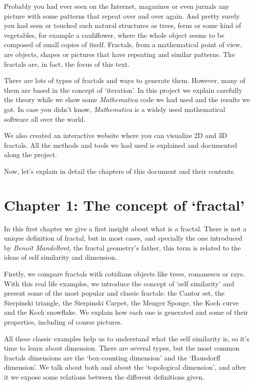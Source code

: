 
Probably you had ever seen on the Internet, magazines or even jurnals any picture with some patterns that repeat over and over again. And pretty surely you had seen or touched such natural structures as trees, ferns or some kind of vegetables, for example a cauliflower, where the whole object seems to be composed of small copies of itself. Fractals, from a mathematical point of view, are objects, shapes or pictures that have repeating and similar patterns. The fractals are, in fact, the focus of this text.

There are lots of types of fractals and ways to generate them. However, many of them are based in the concept of `iteration'. In this project we explain carefully the theory while we show some \textit{Mathematica} code we had used and the results we got. In case you didn't know, \textit{Mathematica} is a widely used mathematical software all over the world. 

We also created an interactive website where you can visualize 2D and 3D fractals. All the methods and tools we had used is explained and documented along the project.

Now, let's explain in detail the chapters of this document and their contents.

\section*{Chapter 1: The concept of `fractal'}

In this first chapter we give a first insight about what is a fractal. There is not a unique definition of fractal, but in most cases, and specially the one introduced by \textit{Benoit Mandelbrot}, the fractal geometry's father, this term is related to the ideas of self similarity and dimension. 

Firstly, we compare fractals with cotidians objects like trees, romanescu or rays. With this real life examples, we introduce the concept of `self similarity' and present some of the most popular and classic fractals: the Cantor set, the Sierpinski triangle, the Sierpinski Carpet, the Menger Sponge, the Koch curve and the Koch snowflake. We explain how each one is generated and some of their properties, including of course pictures.

All these classic examples help us to understand what the self similarity is, so it's time to learn about dimension. There are several types, but the most common fractals dimensions are the `box-counting dimension' and the `Hausdorff dimension'. We talk about both and about the `topological dimension', and after it we expose some relations between the different definitions given.

